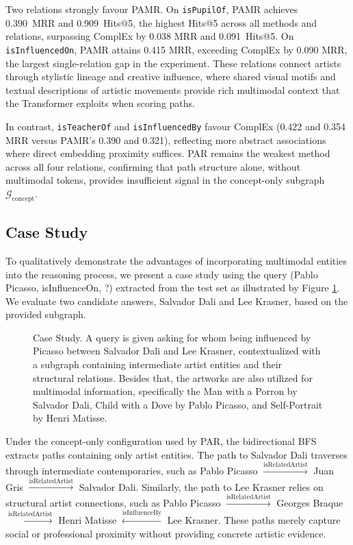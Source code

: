 \documentclass[runningheads]{llncs}
\begin{document}
Two relations strongly favour PAMR. On \texttt{isPupilOf}, PAMR
achieves 0.390~MRR and 0.909~Hits@5, the highest Hits@5 across all
methods and relations, surpassing ComplEx by 0.038 MRR and
0.091~Hits@5. On \texttt{isInfluencedOn}, PAMR attains 0.415 MRR,
exceeding ComplEx by 0.090 MRR, the largest single-relation gap in
the experiment. These relations connect artists through stylistic
lineage and creative influence, where shared visual motifs and textual
descriptions of artistic movements provide rich multimodal context
that the Transformer exploits when scoring paths.

In contrast, \texttt{isTeacherOf} and \texttt{isInfluencedBy} favour
ComplEx (0.422 and 0.354 MRR versus PAMR's 0.390 and 0.321),
reflecting more abstract associations where direct embedding proximity
suffices. PAR remains the weakest method across all four relations,
confirming that path structure alone, without multimodal tokens,
provides insufficient signal in the concept-only subgraph
$\mathcal{G}_{\text{concept}}$.

\subsection{Case Study}
\label{sec:case-study}

To qualitatively demonstrate the advantages of incorporating multimodal entities into the reasoning process, we present a case study using the query (Pablo Picasso, isInfluenceOn, ?) extracted from the test set as illustrated by Figure \ref{fig:case-study}. We evaluate two candidate answers, Salvador Dali and Lee Krasner, based on the provided subgraph.

\begin{figure}[t]
  \centering
  
  \caption{Case Study. A query is given asking for whom being influenced by Picasso between Salvador Dali and Lee Krasner, contextualized with a subgraph containing intermediate artist entities and their structural relations. Besides that, the artworks are also utilized for multimodal information, specifically the Man with a Porron by Salvador Dali, Child with a Dove by Pablo Picasso, and Self-Portrait by Henri Matisse.}
  \label{fig:case-study}
\end{figure}

Under the concept-only configuration used by PAR, the bidirectional BFS extracts paths containing only artist entities. The path to Salvador Dali traverses through intermediate contemporaries, such as Pablo Picasso $\xrightarrow{\text{isRelatedArtist}}$ Juan Gris $\xrightarrow{\text{isRelatedArtist}}$ Salvador Dali. Similarly, the path to Lee Krasner relies on structural artist connections, such as Pablo Picasso $\xrightarrow{\text{isRelatedArtist}}$ Georges Braque $\xrightarrow{\text{isRelatedArtist}}$ Henri Matisse $\xleftarrow{\text{isInfluenceBy}}$ Lee Krasner. These paths merely capture social or professional proximity without providing concrete artistic evidence.
\end{document}
